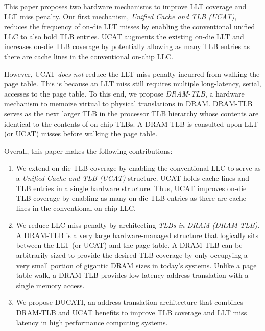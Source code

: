 This paper proposes two hardware mechanisms to improve LLT coverage
and LLT miss penalty. Our first mechanism, {\em Unified Cache and TLB
(UCAT)}, reduces the frequency of on-die LLT misses by enabling the
conventional unified LLC to also hold TLB entries. UCAT augments the
existing on-die LLT and increases on-die TLB coverage by potentially
allowing as many TLB entries as there are cache lines in the
conventional on-chip LLC.


However, UCAT {\em does not} reduce the LLT miss penalty incurred from
walking the page table. This is because an LLT miss still requires
multiple long-latency, serial, accesses to the page table. To this
end, we propose {\em DRAM-TLB}, a hardware mechanism to memoize
virtual to physical translations in DRAM. DRAM-TLB serves as the next
larger TLB in the processor TLB hierarchy whose contents are identical
to the contents of on-chip TLBs. A DRAM-TLB is consulted upon LLT (or
UCAT) misses before walking the page table.



Overall, this paper makes the following contributions:

\begin{enumerate}

  \item{We extend on-die TLB coverage by enabling the conventional LLC
    to serve as a {\em Unified Cache and TLB (UCAT)} structure. UCAT
    holds cache lines and TLB entries in a single hardware structure.
    Thus, UCAT improves on-die TLB coverage by enabling as many on-die
    TLB entries as there are cache lines in the conventional on-chip
    LLC.}

  \item{We reduce LLC miss penalty by architecting {\em TLBs in DRAM
    (DRAM-TLB)}. A DRAM-TLB is a very large hardware-managed structure
    that logically sits between the LLT (or UCAT) and the page table.
    A DRAM-TLB can be arbitrarily sized to provide the desired TLB
    coverage by only occupying a very small portion of gigantic DRAM
    sizes in today's systems. Unlike a page table walk, a DRAM-TLB
    provides low-latency address translation with a single memory
    access. }


  \item{We propose DUCATI, an address translation architecture that
  combines DRAM-TLB and UCAT benefits to improve TLB coverage and LLT
  miss latency in high performance computing systems.}

\end{enumerate}

